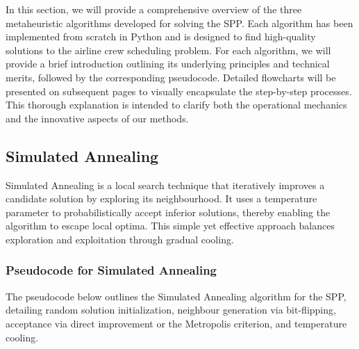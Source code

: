 \documentclass[12pt]{article}
\begin{document}
In this section, we will provide a comprehensive overview of the three metaheuristic algorithms developed for solving the SPP. Each algorithm has been implemented from scratch in Python and is designed to find high-quality solutions to the airline crew scheduling problem.
For each algorithm, we will provide a brief introduction outlining its underlying principles and technical merits, followed by the corresponding pseudocode. Detailed flowcharts will be presented on subsequent pages to visually encapsulate the step-by-step processes. 
This thorough explanation is intended to clarify both the operational mechanics and the innovative aspects of our methods. 

\newpage

\subsection{Simulated Annealing}
Simulated Annealing is a local search technique that iteratively improves a candidate solution by exploring its neighbourhood. It uses a temperature parameter to probabilistically accept inferior solutions, thereby enabling the algorithm to escape local optima. 
This simple yet effective approach balances exploration and exploitation through gradual cooling.

\subsubsection{Pseudocode for Simulated Annealing}
The pseudocode below outlines the Simulated Annealing algorithm for the SPP, detailing random solution initialization, neighbour generation via bit-flipping, acceptance via direct improvement or the Metropolis criterion, and temperature cooling.
\end{document}
